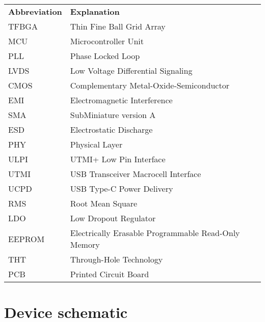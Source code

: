 \documentclass[twoside]{ctuthesis}
\theoremstyle{plain}
\theoremstyle{definition}
\theoremstyle{note}
\begin{document}
\newpage
\begin{tabularx}{\linewidth}
	{ l >{\raggedright\arraybackslash}X }
	\bfseries Abbreviation & \bfseries Explanation\\\Midrule
	TFBGA & Thin Fine Ball Grid Array\\
	MCU & Microcontroller Unit\\
	PLL & Phase Locked Loop\\
	LVDS & Low Voltage Differential Signaling\\
	CMOS & Complementary Metal-Oxide-Semiconductor\\
	EMI & Electromagnetic Interference\\
	SMA & SubMiniature version A\\
	ESD & Electrostatic Discharge\\
	PHY & Physical Layer\\
	ULPI & UTMI+ Low Pin Interface\\
	UTMI & USB Transceiver Macrocell Interface\\
	UCPD & USB Type-C Power Delivery\\
	RMS & Root Mean Square\\
	LDO & Low Dropout Regulator\\
	EEPROM & Electrically Erasable Programmable Read-Only Memory\\
	THT & Through-Hole Technology\\
	PCB & Printed Circuit Board\\
\end{tabularx}

\chapter*{Device schematic}
\noindent

\end{document}
